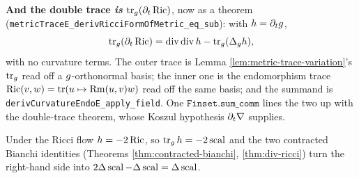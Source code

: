 \begin{lemma}
  \textbf{And the double trace \emph{is} $\operatorname{tr}_g(\partial_t\operatorname{Ric})$},
  now as a theorem
  (\texttt{metricTraceE\_derivRicciFormOfMetric\_eq\_sub}): with $h =
  \partial_tg$,
  \[
    \operatorname{tr}_g(\partial_t \operatorname{Ric})
      = \operatorname{div}\operatorname{div} h
        - \operatorname{tr}_g(\Delta_g h),
  \]
  with no curvature terms. The outer trace is Lemma
  \ref{lem:metric-trace-variation}'s $\operatorname{tr}_g$ read off a
  $g$-orthonormal basis; the inner one is the endomorphism trace
  $\operatorname{Ric}(v,w) = \operatorname{tr}(u \mapsto \operatorname{Rm}(u,v)w)$ read off the same
  basis; and the summand is
  \texttt{derivCurvatureEndoE\_apply\_field}. One
  $\texttt{Finset.sum\_comm}$ lines the two up with the double-trace theorem,
  whose Koszul hypothesis $\partial_t\nabla$ supplies.

  Under the Ricci flow $h = -2\operatorname{Ric}$, so $\operatorname{tr}_g h = -2\operatorname{scal}$ and
  the two contracted Bianchi identities (Theorems
  \ref{thm:contracted-bianchi}, \ref{thm:div-ricci}) turn the right-hand side
  into $2\Delta\operatorname{scal} - \Delta\operatorname{scal} = \Delta\operatorname{scal}$.
\end{lemma}

